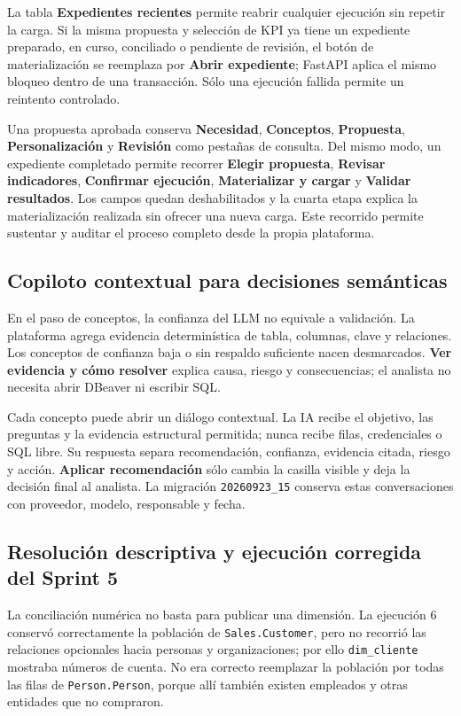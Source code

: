 \documentclass[11pt,letterpaper]{article}
\newcommand{\file}[1]{\texttt{#1}}
\begin{document}
La tabla \textbf{Expedientes recientes} permite reabrir cualquier ejecución sin repetir la carga. Si la misma propuesta y selección de KPI ya tiene un expediente preparado, en curso, conciliado o pendiente de revisión, el botón de materialización se reemplaza por \textbf{Abrir expediente}; FastAPI aplica el mismo bloqueo dentro de una transacción. Sólo una ejecución fallida permite un reintento controlado.

Una propuesta aprobada conserva \textbf{Necesidad}, \textbf{Conceptos}, \textbf{Propuesta}, \textbf{Personalización} y \textbf{Revisión} como pestañas de consulta. Del mismo modo, un expediente completado permite recorrer \textbf{Elegir propuesta}, \textbf{Revisar indicadores}, \textbf{Confirmar ejecución}, \textbf{Materializar y cargar} y \textbf{Validar resultados}. Los campos quedan deshabilitados y la cuarta etapa explica la materialización realizada sin ofrecer una nueva carga. Este recorrido permite sustentar y auditar el proceso completo desde la propia plataforma.

\subsection{Copiloto contextual para decisiones semánticas}

En el paso de conceptos, la confianza del LLM no equivale a validación. La plataforma agrega evidencia determinística de tabla, columnas, clave y relaciones. Los conceptos de confianza baja o sin respaldo suficiente nacen desmarcados. \textbf{Ver evidencia y cómo resolver} explica causa, riesgo y consecuencias; el analista no necesita abrir DBeaver ni escribir SQL.

Cada concepto puede abrir un diálogo contextual. La IA recibe el objetivo, las preguntas y la evidencia estructural permitida; nunca recibe filas, credenciales o SQL libre. Su respuesta separa recomendación, confianza, evidencia citada, riesgo y acción. \textbf{Aplicar recomendación} sólo cambia la casilla visible y deja la decisión final al analista. La migración \file{20260923\_15} conserva estas conversaciones con proveedor, modelo, responsable y fecha.

\subsection{Resolución descriptiva y ejecución corregida del Sprint 5}

La conciliación numérica no basta para publicar una dimensión. La ejecución 6 conservó correctamente la población de \file{Sales.Customer}, pero no recorrió las relaciones opcionales hacia personas y organizaciones; por ello \file{dim\_cliente} mostraba números de cuenta. No era correcto reemplazar la población por todas las filas de \file{Person.Person}, porque allí también existen empleados y otras entidades que no compraron.
\end{document}
